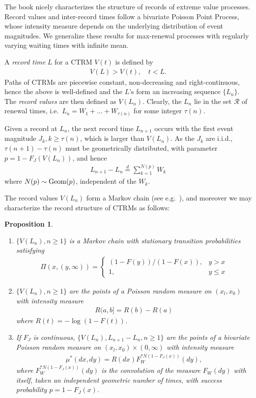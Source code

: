 \documentclass[12pt, a4paper]{article}
\newtheorem{proposition}[equation]{Proposition}
\newcommand{\1}{\mathbf 1}
\begin{document}
The book \cite[Chapter 4]{resnick2013extreme} nicely characterizes the structure of records of extreme value processes. Record values and inter-record times follow a bivariate Poisson Point Process, whose intensity measure depends on the underlying distribution of event magnitudes. We generalize these results for max-renewal processes with regularly varying waiting times with infinite mean. 

A \textit{record time} $L$ for a CTRM $V(t)$ is defined by 
\begin{align*}
V(L) > V(t), \quad t < L.
\end{align*}
Paths of CTRMs are piecewise constant, non-decreasing and right-continuous, hence the above is well-defined and the $L$'s form an increasing sequence $\{L_n\}$. The \textit{record values} are then defined as $V(L_n)$. Clearly, the $L_n$ lie in the set $\mathcal R$ of renewal times, i.e.\ $L_n = W_1 + \ldots + W_{\tau(n)}$ for some integer $\tau(n)$. 

Given a record at $L_n$, the next record time $L_{n+1}$ occurs with the first event magnitude $J_k, k \ge \tau(n)$, which is larger than $V(L_n)$. As the $J_k$ are i.i.d., $\tau(n+1) - \tau(n)$ must be geometrically distributed, with parameter $p = 1 - F_J(V(L_n))$, and hence 
\begin{align} \label{eq:geometric-sum}
L_{n+1} - L_n \stackrel{d}{=} \sum_{k=1}^{N(p)} W_k
\end{align}
where $N(p) \sim {\rm Geom}(p)$, independent of the $W_k$. 

The record values $V(L_n)$ form a Markov chain (see e.g.\ \cite{resnick2013extreme}), and moreover we may characterize the record structure of CTRMs as follows: 

\begin{proposition}
\begin{enumerate}
\item
$\{V(L_n), n \ge 1\}$ is a Markov chain with stationary transition probabilities satisfying
\begin{align*}
\Pi(x, (y,\infty)) = 
\begin{cases}
(1-F(y)) / (1-F(x)), & y > x
\\
1, & y \le x
\end{cases}
\end{align*}
\item
$\{V(L_n), n \ge 1\}$ are the points of a Poisson random measure on $(x_l, x_0)$ with intensity measure
\begin{align*}
R(a,b] = R(b) - R(a)
\end{align*}
where $R(t) = -\log(1-F(t))$. 
\item
If $F_J$ is continuous, $\{V(L_n), L_{n+1} - L_n, n \ge 1\}$ are the points of a bivariate Poisson random measure on
$(x_l, x_0) \times (0,\infty)$ with intensity measure
\begin{align*}
\mu^*(dx, dy) = R(dx) F_W^{*N(1-F_J(x))}(dy),
\end{align*}
where $F_W^{*N(1-F_J(x))}(dy)$ is the convolution of the measure $F_W(dy)$ with itself, taken an independent geometric number of times, with success probability $p = 1-F_J(x)$.
\end{enumerate}
\end{proposition}
\end{document}
